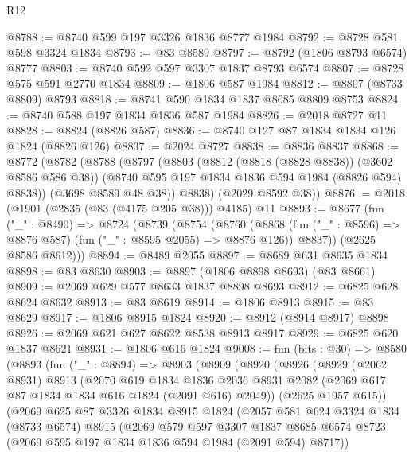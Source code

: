 \begin{lexlean}{R12}
\begin{coremodule}
@8788 := @8740 @599 @197 @3326 @1836 @8777 @1984
@8792 := @8728 @581 @598 @3324 @1834
@8793 := @83 @8589
@8797 := @8792 (@1806 @8793 @6574) @8777
@8803 := @8740 @592 @597 @3307 @1837 @8793 @6574
@8807 := @8728 @575 @591 @2770 @1834
@8809 := @1806 @587 @1984
@8812 := @8807 (@8733 @8809) @8793
@8818 := @8741 @590 @1834 @1837 @8685 @8809 @8753
@8824 := @8740 @588 @197 @1834 @1836 @587 @1984
@8826 := @2018 @8727 @11
@8828 := @8824 (@8826 @587)
@8836 := @8740 @127 @87 @1834 @1834 @126 @1824 (@8826 @126)
@8837 := @2024 @8727
@8838 := @8836 @8837
@8868 := @8772
    (@8782
      (@8788
        (@8797
          (@8803
            (@8812 (@8818 (@8828 @8838)) (@3602 @8586 @586 @38))
            (@8740 @595 @197 @1834 @1836 @594 @1984 (@8826 @594) @8838))
          (@3698 @8589 @48 @38))
        @8838)
      (@2029 @8592 @38))
@8876 := @2018 (@1901 (@2835 (@83 (@4175 @205 @38))) @4185) @11
@8893 := @8677
    (fun ("_" : @8490) =>
    @8724
      (@8739
        (@8754
          (@8760
            (@8868 (fun ("_" : @8596) => @8876 @587) (fun ("_" : @8595 @2055) => @8876 @126))
            @8837))
        (@2625 @8586 @8612)))
@8894 := @8489 @2055
@8897 := @8689 @631 @8635 @1834
@8898 := @83 @8630
@8903 := @8897 (@1806 @8898 @8693) (@83 @8661)
@8909 := @2069 @629 @577 @8633 @1837 @8898 @8693
@8912 := @6825 @628 @8624 @8632
@8913 := @83 @8619
@8914 := @1806 @8913
@8915 := @83 @8629
@8917 := @1806 @8915 @1824
@8920 := @8912 (@8914 @8917) @8898
@8926 := @2069 @621 @627 @8622 @8538 @8913 @8917
@8929 := @6825 @620 @1837 @8621
@8931 := @1806 @616 @1824
@9008 := fun (bits : @30) =>
  @8580
    (@8893
      (fun ("_" : @8894) =>
      @8903
        (@8909
          (@8920
            (@8926
              (@8929
                (@2062 @8931)
                @8913
                (@2070
                  @619
                  @1834
                  @1836
                  @2036
                  @8931
                  @2082
                  (@2069 @617 @87 @1834 @1834 @616 @1824 (@2091 @616) @2049))
                (@2625 @1957 @615))
              (@2069
                @625
                @87
                @3326
                @1834
                @8915
                @1824
                (@2057
                  @581
                  @624
                  @3324
                  @1834
                  (@8733 @6574)
                  @8915
                  (@2069
                    @579
                    @597
                    @3307
                    @1837
                    @8685
                    @6574
                    @8723
                    (@2069 @595 @197 @1834 @1836 @594 @1984 (@2091 @594) @8717))

\end{coremodule}
\end{lexlean}
